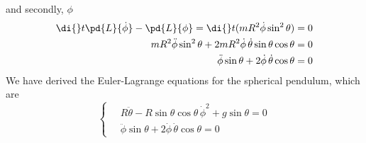 and secondly, $\phi$
\begin{align*}
  \di {} t \pd{L}{\dot\phi} - \pd{L}{\phi} = \di {} t  (mR^2 \dot \phi \sin^2 \theta) &= 0\\
  mR^2\ddot\phi\sin^2 \theta + 2mR^2\dot \phi\,\dot\theta \sin \theta\cos \theta &= 0\\
  \ddot\phi\sin \theta + 2\dot \phi\,\dot\theta\cos \theta &= 0\\
\end{align*}
We have derived the Euler-Lagrange equations for the spherical pendulum, which are
$$ \begin{cases}
  \quad R\ddot{\theta} - R\sin \theta \cos \theta\,\dot \phi^2 + g\sin \theta = 0\\
  \quad\ddot\phi\sin \theta + 2\dot \phi\,\dot\theta\cos \theta = 0
\end{cases} $$
